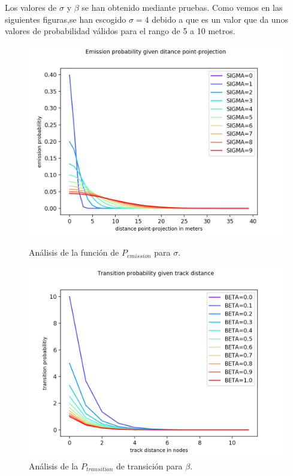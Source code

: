 Los valores de $\sigma$ y $\beta$ se han obtenido mediante pruebas. Como vemos en las 
siguientes figuras,se han escogido $\sigma = 4$ debido a que es un valor que da unos valores de 
probabilidad válidos para el rango de 5 a 10 metros. 

\begin{figure}[!htb]
\begin{minipage}{0.46\textwidth}
\centering
\includegraphics[width=1.2\textwidth]{./Imagenes/EmissionProb.png}
\caption{Análisis de la función de $P_{emission}$ para $\sigma$.}
\label{figure:EmissionProb}
\end{minipage}\hfill
\begin{minipage}{0.46\textwidth}
\centering
\includegraphics[width=1.2\textwidth]{./Imagenes/TransitionProb.png}
\caption{Análisis de la $P_{transition}$ de transición para $\beta$.}
\label{figure:TransitionProb}
\end{minipage}
\end{figure}

